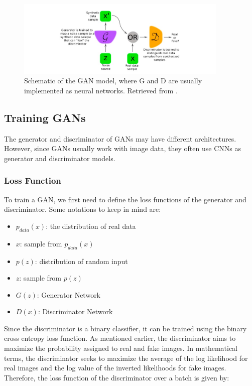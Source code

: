 \begin{figure}[!htb]
  \centering
  \includegraphics[width=0.90\textwidth]{Images/GAN.jpg}
  \caption[Schematic of the \ac{GAN} model, where G and D are usually implemented as neural networks.]{Schematic of the \ac{GAN} model, where G and D are usually implemented as neural networks. Retrieved from \cite{GAN}.}
  \label{GAN}
\end{figure}

\subsection{Training GANs}

The generator and discriminator of \ac{GANs} may have different architectures. However, since \ac{GANs} usually work with image data, they often use \ac{CNNs} as generator and discriminator models.

\subsubsection*{Loss Function}

To train a \ac{GAN}, we first need to define the loss functions of the generator and discriminator. Some notations to keep in mind are:

\begin{itemize}
    \item $p_{data}(x)$: the distribution of real data
    \item $x$: sample from $p_{data}(x)$
    \item $p(z)$: distribution of random input
    \item $z$: sample from $p(z)$
    \item $G(z)$: Generator Network
    \item $D(x)$: Discriminator Network
\end{itemize}

Since the discriminator is a binary classifier, it can be trained using the binary cross entropy loss function. As mentioned earlier, the discriminator aims to maximize the probability assigned to real and fake images. In mathematical terms, the discriminator seeks to maximize the average of the log likelihood for real images and the log value of the inverted likelihoods for fake images. Therefore, the loss function of the discriminator over a batch is given by:

